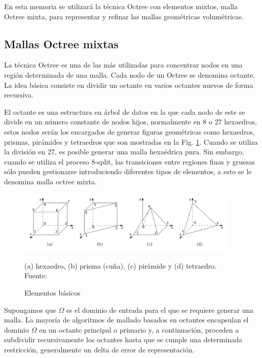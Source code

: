 En esta memoria se utilizará la técnica Octree con elementos mixtos, malla Octree mixta, para representar y refinar las mallas geométricas volumétricas.

\subsection{Mallas Octree mixtas}

La técnica Octree es una de las más utilizadas para concentrar nodos en una región determinada de una malla. 
Cada nodo de un Octree se denomina octante. La idea básica consiste en dividir un octante en varios octantes nuevos de forma recursiva.

El octante es una estructura en árbol de datos en la que cada nodo de este se divide en un número constante de nodos hijos, normalmente en 8 o 27 hexaedros, estos nodos serán los encargados de generar figuras geométricas como hexaedros, prismas, pirámides y tetraedros que son mostradas en la Fig. \ref{fig:basics_elements}.
Cuando se utiliza la división en 27, es posible generar una malla hexaédrica pura. Sin embargo, cuando se utiliza el proceso 8-split, las transiciones entre regiones finas y gruesas sólo pueden gestionarse introduciendo diferentes tipos de elementos, a esto se le denomina malla octree mixta.

\begin{figure}[h]
    \centering
    \includegraphics[width=0.95\textwidth]{figures/basic-elements.png}
    \caption{\label{fig:basics_elements} Elementos básicos}
     \small{(a) hexaedro, (b) prisma (cuña), (c) pirámide y (d) tetraedro.} \\
    Fuente: \cite{Gonzalez2014}
\end{figure}

Supongamos que $\Omega$ es el dominio de entrada para el que se requiere generar una malla. La mayoría de algoritmos de mallado basados en octantes encapsulan el dominio $\Omega$ en un octante principal o primario y, a continuación, proceden a subdividir recursivamente los octantes hasta que se cumple una determinada restricción, generalmente un delta de error de representación.

